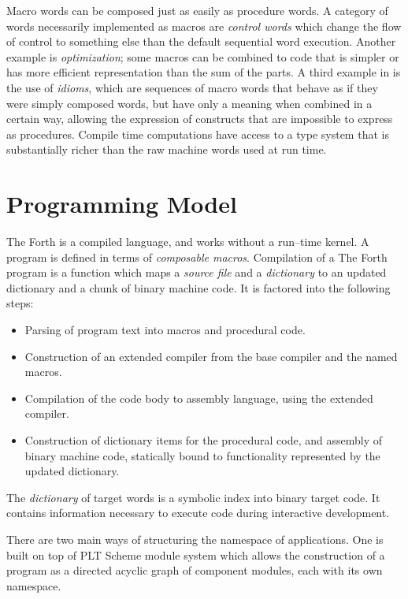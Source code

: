 \documentclass[12pt]{article}
\begin{document}
Macro words can be composed just as easily as procedure words. A
category of words necessarily implemented as macros are \emph{control
  words} which change the flow of control to something else than the
default sequential word execution.  Another example is
\emph{optimization}; some macros can be combined to code that is
simpler or has more efficient representation than the sum of the
parts. A third example in is the use of \emph{idioms}, which are
sequences of macro words that behave as if they were simply composed
words, but have only a meaning when combined in a certain way,
allowing the expression of constructs that are impossible to express
as procedures. Compile time computations have access to a type system
that is substantially richer than the raw machine words used at run
time.


\section{Programming Model}

The Forth is a compiled language, and works without a run--time
kernel. A program is defined in terms of \emph{composable macros}.
Compilation of a The Forth program is a function which maps a
\emph{source file} and a \emph{dictionary} to an updated dictionary
and a chunk of binary machine code. It is factored into the following
steps:

\begin{itemize}
\item Parsing of program text into macros and procedural code.
\item Construction of an extended compiler from the base compiler and
  the named macros.
\item Compilation of the code body to assembly language, using the
  extended compiler.
\item Construction of dictionary items for the procedural code, and
  assembly of binary machine code, statically bound to functionality
  represented by the updated dictionary.
\end{itemize}

The \emph{dictionary} of target words is a symbolic index into binary
target code. It contains information necessary to execute code during
interactive development.

There are two main ways of structuring the namespace of
applications. One is built on top of PLT Scheme module system which
allows the construction of a program as a directed acyclic graph of
component modules, each with its own namespace.
\end{document}

